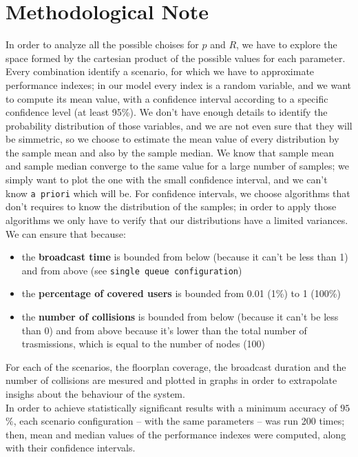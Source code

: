 \section*{Methodological Note}\label{Methodological}
In order to analyze all the possible choises for $p$ and $R$, we have to explore the space
formed by the cartesian product of the possible values for each parameter. Every combination 
identify a scenario, for which we have to approximate performance indexes; in our model
every index is a random variable, and we want to compute its mean value, with a confidence interval
according to a specific confidence level (at least 95\%). 
We don't have enough details to identify the probability distribution of those variables, and 
we are not even sure that they will be simmetric, so we choose to estimate the mean value of every 
distribution by the sample mean and also by the sample median.
We know that sample mean and sample median converge to the same value for a large number
of samples; we simply want to plot the one with the small confidence interval, and we can't know
\texttt{a priori} which will be.
For confidence intervals, we choose algorithms that don't requires to know the distribution of the
samples; in order to apply those algorithms we only have to verify that our distributions have a 
limited variances. We can ensure that because:
\begin{itemize}
    \item the \textbf{broadcast time} is bounded from below (because it can't be less than 1) and from above
        (see \texttt{single queue configuration})
    \item the \textbf{percentage of covered users} is bounded from 0.01 (1\%) to 1 (100\%)
    \item the \textbf{number of collisions} is bounded from below (because it can't be less than 0) and
        from above because it's lower than the total number of trasmissions, which is equal to the number of nodes (100)
\end{itemize} 

For each of the scenarios, the floorplan coverage, the
broadcast duration and the number of collisions are mesured and plotted in graphs in order to 
extrapolate insighs about the behaviour of the system.\\
In order to achieve statistically significant results with a minimum accuracy of
$95$\%, each scenario configuration -- with the same parameters -- was run 200 times; then, mean and median values of the performance
indexes were computed, along with their confidence intervals.
